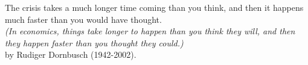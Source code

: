 \documentclass[aspectratio=169]{beamer}
\begin{document}
	\begin{frame}
		
		{\LARGE The crisis takes a much longer time coming than you think, and then it happens much faster than you would have thought.}\\ 
		\vspace{1em}
		{\LARGE \textit{(In economics, things take longer to happen than you think they will, and then they happen faster than you thought they could.)}}\\ 
		\vspace{1em}
		{\large by Rudiger Dornbusch (1942-2002).}
		
	\end{frame}
\end{document}
